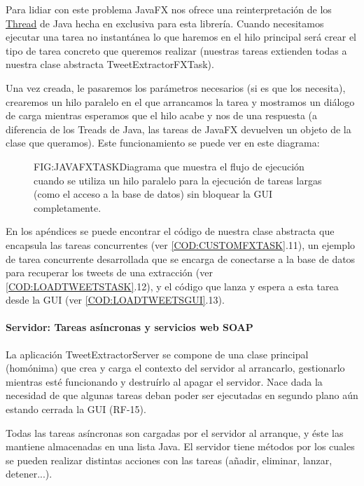 Para lidiar con este problema JavaFX nos ofrece una reinterpretación de los \href{https://docs.oracle.com/javase/7/docs/api/java/lang/Thread.html}{Thread} de Java hecha en exclusiva para esta librería.
Cuando necesitamos ejecutar una tarea no instantánea lo que haremos en el hilo principal será crear el tipo de tarea concreto que queremos realizar (nuestras tareas extienden todas a nuestra clase abstracta TweetExtractorFXTask).

Una vez creada, le pasaremos los parámetros necesarios (si es que los necesita), crearemos un hilo paralelo en el que arrancamos la tarea y mostramos un diálogo de carga mientras esperamos que el hilo acabe y nos de una respuesta (a diferencia de los Treads de Java, las tareas de JavaFX devuelven un objeto de la clase que queramos). Este funcionamiento se puede ver en este diagrama:

\begin{figure}[Diagrama de funcionamiento de JavaFX Task]{FIG:JAVAFXTASK}{Diagrama que muestra el flujo de ejecución cuando se utiliza un hilo paralelo para la ejecución de tareas largas (como el acceso a la base de datos) sin bloquear la GUI completamente.}
\end{figure}

En los apéndices se puede encontrar el código de nuestra clase abstracta que encapsula las tareas concurrentes (ver \cref{COD:CUSTOMFXTASK}.11), un ejemplo de tarea concurrente desarrollada que se encarga de conectarse a la base de datos para recuperar los tweets de una extracción (ver \cref{COD:LOADTWEETSTASK}.12), y el código que lanza y espera a esta tarea desde la GUI (ver \cref{COD:LOADTWEETSGUI}.13).\newpage

\paragraph{Servidor: Tareas asíncronas y servicios web SOAP}
La aplicación TweetExtractorServer se compone de una clase principal (homónima) que crea y carga el contexto del servidor al arrancarlo, gestionarlo mientras esté funcionando y destruírlo al apagar el servidor. Nace dada la necesidad de que algunas tareas deban poder ser ejecutadas en segundo plano aún estando cerrada la GUI (RF-15).

Todas las tareas asíncronas son cargadas por el servidor al arranque, y éste las mantiene almacenadas en una lista Java. El servidor tiene métodos por los cuales se pueden realizar distintas acciones con las tareas (añadir, eliminar, lanzar, detener...).

